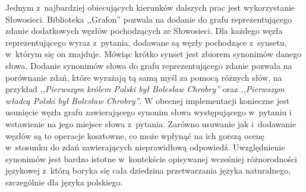 \documentclass[a4paper, twoside, openright, 12pt]{report}
\begin{document}
    Jednym z~najbardziej obiecujących kierunków dalszych prac jest wykorzystanie Słowosieci. Biblioteka ,,Grafon''
    pozwala na dodanie do grafu reprezentującego zdanie dodatkowych węzłów pochodzących ze Słowosieci. Dla każdego
    węzła reprezentującego wyraz z~pytania, dodawane są węzły pochodzące z~synsetu, w~którym się on znajduje. Mówiąc
    krótko synset jest zbiorem synonimów danego słowa. Dodanie synonimów słowa do grafu reprezentującego zdanie pozwala
    na porównanie zdań, które wyrażają tą samą myśl za pomocą różnych słów, na przykład
    \emph{,,Pierwszym królem Polski był Bolesław Chrobry''} oraz \emph{,,Pierwszym władcą Polski był Bolesław Chrobry''}.
    W obecnej implementacji konieczne jest usunięcie węzła grafu zawierającego synonim słowa występującego w~pytaniu i
    wstawienie na jego miejsce słowa z~pytania. Zarówno usuwanie jak i~dodawanie węzłów są to operacje kosztowne,
    co może wpłynąć na ich gorszą ocenę w~stosunku do zdań zawierających nieprawidłową odpowiedź. Uwzględnienie synonimów
    jest bardzo istotne w~kontekście opisywanej wcześniej różnorodności językowej z~którą boryka się cała dziedzina
    przetwarzania języka naturalnego, szczególnie dla języka polskiego.
\end{document}
